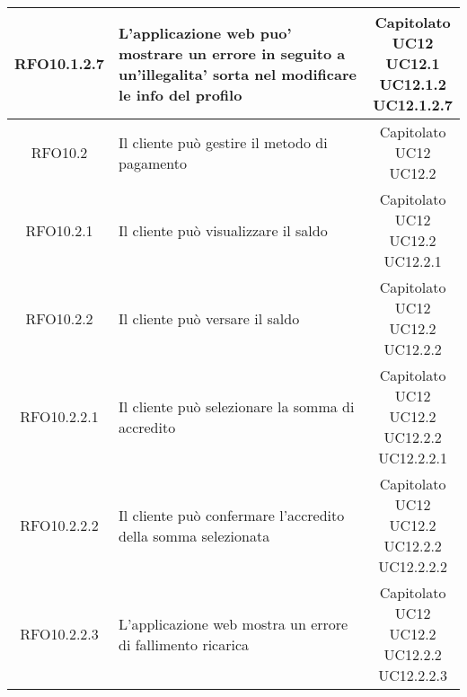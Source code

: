 \begin{longtable}{|c|p{8cm}|c|}
\hypertarget{RFO10.1.2.7}{RFO10.1.2.7} &  L'applicazione web puo' mostrare un errore in seguito a un'illegalita' sorta nel modificare le info del profilo & \makecell*{Capitolato\\UC12\\UC12.1\\UC12.1.2\\UC12.1.2.7} \\
\hline

\hypertarget{RFO10.2}{RFO10.2} &  Il cliente può gestire il metodo di pagamento & \makecell*{Capitolato\\UC12\\UC12.2} \\
\hline

\hypertarget{RFO10.2.1}{RFO10.2.1} &  Il cliente può visualizzare il saldo & \makecell*{Capitolato\\UC12\\UC12.2\\UC12.2.1} \\
\hline

\hypertarget{RFO10.2.2}{RFO10.2.2} &  Il cliente può versare il saldo & \makecell*{Capitolato\\UC12\\UC12.2\\UC12.2.2} \\
\hline

\hypertarget{RFO10.2.2.1}{RFO10.2.2.1} &  Il cliente può selezionare la somma di accredito & \makecell*{Capitolato\\UC12\\UC12.2\\UC12.2.2\\UC12.2.2.1} \\
\hline

\hypertarget{RFO10.2.2.2}{RFO10.2.2.2} &  Il cliente può confermare l'accredito della somma selezionata & \makecell*{Capitolato\\UC12\\UC12.2\\UC12.2.2\\UC12.2.2.2} \\
\hline

\hypertarget{RFO10.2.2.3}{RFO10.2.2.3} &  L'applicazione web mostra un errore di fallimento ricarica & \makecell*{Capitolato\\UC12\\UC12.2\\UC12.2.2\\UC12.2.2.3} \\
\hline


\end{longtable}
